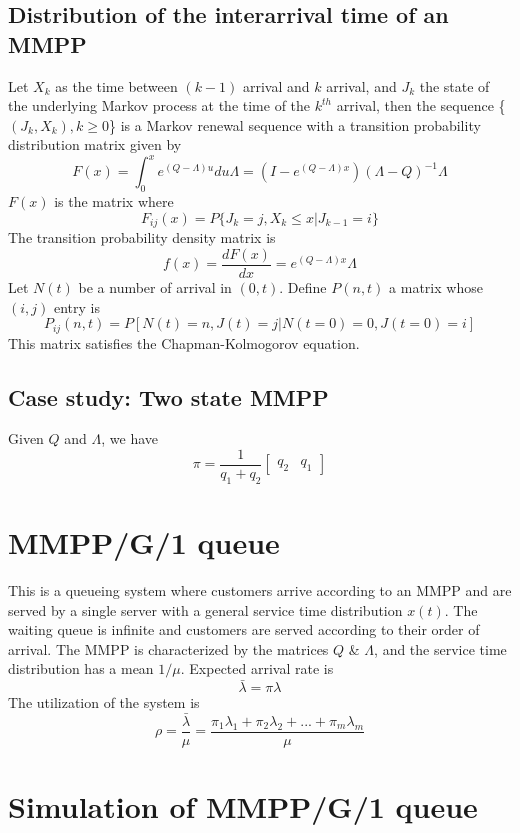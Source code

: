 \documentclass[a4paper]{article}
\begin{document}
\subsection{Distribution  of  the  interarrival time of an MMPP}
Let $X_k$ as the time between $(k-1)$ arrival and $k$ arrival, and $J_k$ the state of the underlying Markov process at the time of the $k^{th}$ arrival, then the sequence \{$(J_k,X_k), k \ge 0$\} is a Markov renewal sequence with a transition probability distribution matrix given by
$$F(x) = \int_0^x e^{(Q-\Lambda)u}du\Lambda = (I - e^{(Q-\Lambda)x})(\Lambda - Q)^{-1}\Lambda$$
$F(x)$ is the matrix where $$F_{ij}(x) = P\{J_k = j, X_k \le x | J_{k-1} = i\}$$
The transition probability density matrix is $$ f(x) = \frac{dF(x)}{dx} = e^{(Q-\Lambda)x}\Lambda$$
Let $N(t)$ be a number of arrival in $(0, t)$. Define $P(n,t)$ a matrix whose $(i,j)$ entry is 
$$P_{ij}(n,t) = P[N(t) = n, J(t) = j | N(t=0)=0, J(t=0)=i] $$
This matrix satisfies the Chapman-Kolmogorov equation. 
\subsection {Case study: Two state MMPP}
Given $Q$ and $\Lambda$, we have $$\pi = \frac{1}{q_1 + q_2}\begin{bmatrix} q_2 & q_1 \end{bmatrix} $$
\section{MMPP/G/1 queue}
This is a queueing system where customers arrive according to an MMPP and are served by a single server with a general service time distribution $x(t)$. The
waiting queue is infinite and customers are served according to their order of arrival.
The MMPP is characterized by the matrices $Q$ \& $\Lambda$, and the service time distribution has a mean $1/\mu$.
Expected arrival rate is $$\bar{\lambda} = \pi\lambda $$
The utilization of the system is $$ \rho = \frac{\bar{\lambda}}{\mu} = \frac{\pi_1\lambda_1 + \pi_2\lambda_2 + ... + \pi_m\lambda_m}{\mu}$$

\section{Simulation of MMPP/G/1 queue}
\end{document}

